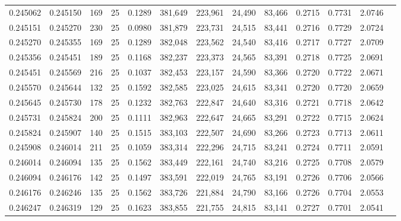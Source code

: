 \begin{tabular}{rrrrrrrrrrrrr}
0.245062 & 0.245150 &   169 &  25 &                                     0.1289 & 381,649 & 223,961 &  24,490 &  83,466 & 0.2715 & 0.7731 & 2.0746 \\
0.245151 & 0.245270 &   230 &  25 &                                     0.0980 & 381,879 & 223,731 &  24,515 &  83,441 & 0.2716 & 0.7729 & 2.0724 \\
0.245270 & 0.245355 &   169 &  25 &                                     0.1289 & 382,048 & 223,562 &  24,540 &  83,416 & 0.2717 & 0.7727 & 2.0709 \\
0.245356 & 0.245451 &   189 &  25 &                                     0.1168 & 382,237 & 223,373 &  24,565 &  83,391 & 0.2718 & 0.7725 & 2.0691 \\
0.245451 & 0.245569 &   216 &  25 &                                     0.1037 & 382,453 & 223,157 &  24,590 &  83,366 & 0.2720 & 0.7722 & 2.0671 \\
0.245570 & 0.245644 &   132 &  25 &                                     0.1592 & 382,585 & 223,025 &  24,615 &  83,341 & 0.2720 & 0.7720 & 2.0659 \\
0.245645 & 0.245730 &   178 &  25 &                                     0.1232 & 382,763 & 222,847 &  24,640 &  83,316 & 0.2721 & 0.7718 & 2.0642 \\
0.245731 & 0.245824 &   200 &  25 &                                     0.1111 & 382,963 & 222,647 &  24,665 &  83,291 & 0.2722 & 0.7715 & 2.0624 \\
0.245824 & 0.245907 &   140 &  25 &                                     0.1515 & 383,103 & 222,507 &  24,690 &  83,266 & 0.2723 & 0.7713 & 2.0611 \\
0.245908 & 0.246014 &   211 &  25 &                                     0.1059 & 383,314 & 222,296 &  24,715 &  83,241 & 0.2724 & 0.7711 & 2.0591 \\
0.246014 & 0.246094 &   135 &  25 &                                     0.1562 & 383,449 & 222,161 &  24,740 &  83,216 & 0.2725 & 0.7708 & 2.0579 \\
0.246094 & 0.246176 &   142 &  25 &                                     0.1497 & 383,591 & 222,019 &  24,765 &  83,191 & 0.2726 & 0.7706 & 2.0566 \\
0.246176 & 0.246246 &   135 &  25 &                                     0.1562 & 383,726 & 221,884 &  24,790 &  83,166 & 0.2726 & 0.7704 & 2.0553 \\
0.246247 & 0.246319 &   129 &  25 &                                     0.1623 & 383,855 & 221,755 &  24,815 &  83,141 & 0.2727 & 0.7701 & 2.0541 \\

\end{tabular}
